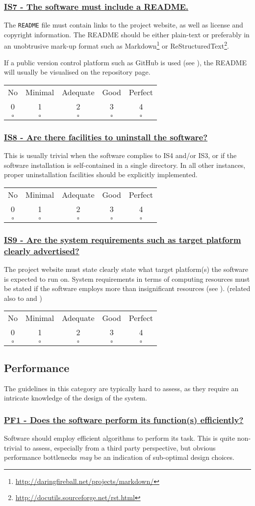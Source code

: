 \documentclass[a4paper,11pt]{article}
\newcommand{\criterion}[2]{\subsubsection*{\underline{#1 - #2}}\label{id:#1}}
\newcommand\CheckTable{%
  \begin{tabular}{ccccc}
    No & Minimal & Adequate & Good & Perfect \\
    0 & 1 & 2 & 3 & 4 \\
    \hline
    $\square$ & $\square$ & $\square$ & $\square$ & $\square$ \\
  \end{tabular}%
}
\newcommand{\refcrit}[1]{%
 \framebox[1.1\width]{\hyperref[id:#1]{#1}}
}
\begin{document}
\newcommand{\isSevenID}{IS7}
\newcommand{\isSevenText}{The software must include a README.}
\criterion{\isSevenID}{\isSevenText}

The \texttt{README} file must contain links to the project website, as well as
license and copyright information. The README should be either plain-text or
preferably in an unobtrusive mark-up format such as
Markdown\footnote{\url{http://daringfireball.net/projects/markdown/}} or
ReStructuredText\footnote{\url{http://docutils.sourceforge.net/rst.html}}.

If a public version control platform such as GitHub is used (see \refcrit{AC2}), the
README will usually be visualised on the repository page.

\CheckTable

\newcommand{\isEightID}{IS8}
\newcommand{\isEightText}{Are there facilities to uninstall the software?}
\criterion{\isEightID}{\isEightText}

This is usually trivial when the software complies to IS4 and/or IS3, or if the
software installation is self-contained in a single directory. In all other
instances, proper uninstallation facilities should be explicitly implemented.

\CheckTable

\newcommand{\isNineID}{IS9}
\newcommand{\isNineText}{Are the system requirements such as target platform clearly advertised?}
\criterion{\isNineID}{\isNineText}

The project website must state clearly state what target platform(s) the software is expected to run on.
System requirements in terms of computing resources must be stated if the
software employs more than insignificant resources (see \refcrit{PF2}).
(related also to \refcrit{B3} and \refcrit{IS2})

\CheckTable

\subsection{Performance}\label{sec:per}

The guidelines in this category are typically hard to assess, as they require
an intricate knowledge of the design of the system. 

\newcommand{\pfOneID}{PF1}
\newcommand{\pfOneText}{Does the software perform its function(s) efficiently?}
\criterion{\pfOneID}{\pfOneText}

Software should employ efficient algorithms to perform its task. This is quite
non-trivial to assess, especially from a third party perspective, but obvious
performance bottlenecks \emph{may} be an indication of sub-optimal design
choices.
\end{document}
